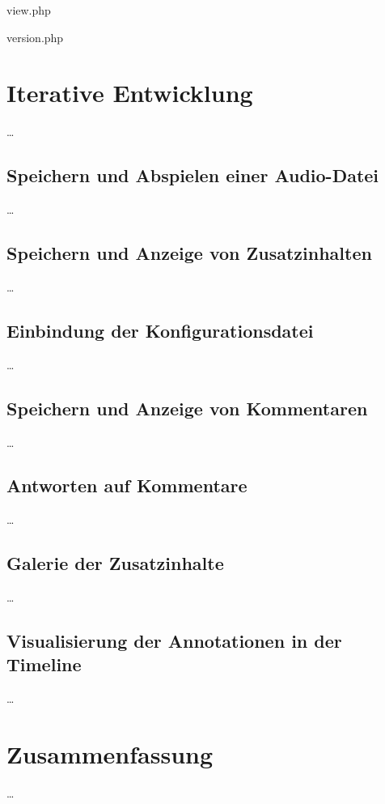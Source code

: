 view.php

version.php



\section{Iterative Entwicklung}
\dots

\subsection{Speichern und Abspielen einer Audio-Datei}
\dots

\subsection{Speichern und Anzeige von Zusatzinhalten}
\dots

\subsection{Einbindung der Konfigurationsdatei}
\dots

\subsection{Speichern und Anzeige von Kommentaren}
\dots

\subsection{Antworten auf Kommentare}
\dots

\subsection{Galerie der Zusatzinhalte}
\dots

\subsection{Visualisierung der Annotationen in der Timeline}
\dots

\section{Zusammenfassung}
\dots